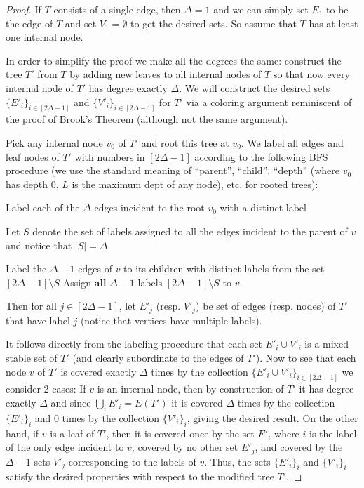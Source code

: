 \documentclass[smallextended]{svjour3}
\begin{document}
	\begin{proof}
		If $T$ consists of a single edge, then $\Delta = 1$ and we can simply set $E_1$ to be the edge of $T$ and set $V_1 = \emptyset$ to get the desired sets. So assume that $T$ has at least one internal node.
		
		In order to simplify the proof we make all the degrees the same: construct the tree $T'$ from $T$ by adding new leaves to all internal nodes of $T$ so that now every internal node of $T'$ has degree exactly $\Delta$. We will construct the desired sets $\{E'_i\}_{i \in [2\Delta - 1]}$ and $\{V'_i\}_{i \in [2\Delta - 1]}$ for $T'$ via a coloring argument reminiscent of the proof of Brook's Theorem (although not the same argument).
				
		 Pick any internal node $v_0$ of $T'$ and root this tree at $v_0$. We label all edges and leaf nodes of $T'$ with numbers in $[2\Delta -1]$ according to the following BFS procedure (we use the standard meaning of ``parent'', ``child'', ``depth'' (where $v_0$ has depth 0, $L$ is the maximum dept of any node), etc. for rooted trees):

\begin{algorithm}[ht!]
\begin{algorithmic}
\label{dalg:convex-sub}
	\STATE Label each of the $\Delta$ edges incident to the root $v_0$ with a distinct label
	
			\STATE Let $S$ denote the set of labels assigned to all the edges incident to the parent of $v$ and notice that $|S| = \Delta$
			
				\STATE Label the $\Delta-1$ edges of $v$ to its children with distinct labels from the set $[2\Delta - 1] \setminus S$
			\ELSE
				\STATE Assign \textbf{all} $\Delta-1$ labels $[2\Delta - 1] \setminus S$ to $v$.
			\ENDIF
		\ENDFOR
	\ENDFOR
\end{algorithmic}
\end{algorithm}
	Then for all $j \in [2 \Delta -1]$, let $E'_j$ (resp. $V'_j$) be set of edges (resp. nodes) of $T'$ that have label $j$ (notice that vertices have multiple labels). 
	
	It follows directly from the labeling procedure that each set $E'_i \cup V'_i$ is a mixed stable set of $T'$ (and clearly subordinate to the edges of $T'$). Now to see that each node $v$ of $T'$ is covered exactly $\Delta$ times by the collection $\{E'_i \cup V'_i\}_{i \in [2\Delta - 1]}$ we consider 2 cases: If $v$ is an internal node, then by construction of $T'$ it has degree exactly $\Delta$ and since $\bigcup_i E'_i = E(T')$ it is covered $\Delta$ times by the collection $\{E'_i\}_i$ and 0 times by the collection $\{V'_i\}_i$, giving the desired result. On the other hand, if $v$ is a leaf of $T'$, then it is covered once by the set $E'_i$ where $i$ is the label of the only edge incident to $v$, covered by no other set $E'_j$, and covered by the $\Delta-1$ sets $V'_j$ corresponding to the labels of $v$. Thus, the sets $\{E'_i\}_i$ and $\{V'_i\}_i$ satisfy the desired properties with respect to the modified tree $T'$.
	

\end{proof}
\end{document}
